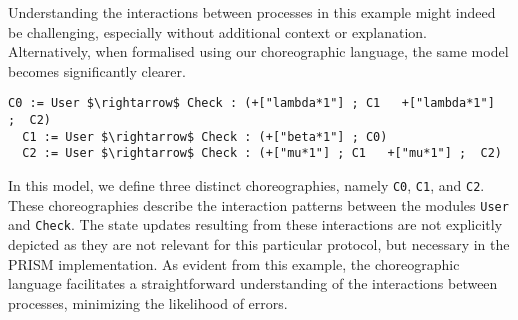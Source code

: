Understanding the interactions between processes in this example might
indeed be challenging, especially without additional context or
explanation.  Alternatively, when formalised using our choreographic
language, the same model becomes significantly clearer.
\begin{lstlisting}[style=chor-color,% caption={Example of Listing \ref{example1} in our choreographic language},captionpos=b,
  frame=none, label={example2}]
  C0 := User $\rightarrow$ Check : (+["lambda*1"] ; C1	 +["lambda*1"]  ;  C2)
  C1 := User $\rightarrow$ Check : (+["beta*1"] ; C0)  
  C2 := User $\rightarrow$ Check : (+["mu*1"] ; C1   +["mu*1"] ;  C2)
\end{lstlisting}
In this model, we define three distinct choreographies, namely
\texttt{C0}, \texttt{C1}, and \texttt{C2}. These choreographies
describe the interaction patterns between the modules \texttt{User}
and \texttt{Check}. The state updates resulting from these
interactions are not explicitly depicted as they are not relevant for
this particular protocol, but necessary in the PRISM implementation.
%
As evident from this example, the choreographic language facilitates a
straightforward understanding of the interactions between processes,
minimizing the likelihood of errors.



